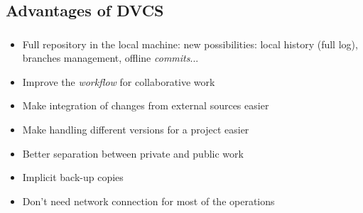 \begin{frame}
\begin{center}
  \end{center}
\end{frame}


\subsection{Advantages of DVCS}
\begin{frame}
  \frametitle{\insertsubsection}

  \begin{itemize}

  \item Full repository in the local machine: new possibilities: local
    history (full log), branches management, offline \textit{commits}...
    \vspacing

  \item Improve the \textit{workflow} for collaborative work
    \vspacing

  \item Make integration of changes from external sources easier
    \vspacing

  \item Make handling different versions for a project easier
    \vspacing

  \item Better separation between private and public work
    \vspacing

  \item Implicit back-up copies
    \vspacing

  \item Don't need network connection for most of the operations
    \vspacing

  \end{itemize}
\end{frame}


